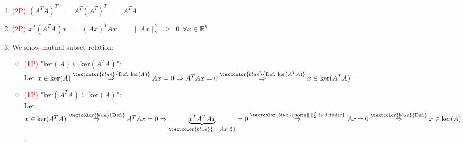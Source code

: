 {
\color{solution}
\begin{enumerate}
	\item   \textcolor{red}{(2P)}
	$(A^TA)^T \ \ =\ \ A^T(A^T)^T\ \ =\ \ A^TA$
	\item  \textcolor{red}{(2P)}
	$x^T(A^TA)x\ \ =\ \ (Ax)^TAx\ \ =\ \ \|{Ax}\|_2^2\ \ \geq\ \ 0\ \ \forall x\in\mathbb{R}^n$
	\item 
	We show mutual subset relation:
	\begin{itemize}
		\item  \textcolor{red}{(1P)}
		\underline{"$\text{ker}(A)\subseteq \text{ker}(A^TA)$":}\\
		Let $x\in \text{ker}(A) \stackrel{\textcolor{blue}{\text{Def.}\ \text{ker}(A)}}{\Rightarrow}Ax=0\Rightarrow A^TAx=0\stackrel{\textcolor{blue}{\text{Def.}\ \text{ker}(A^TA)}}{\Rightarrow}x\in \text{ker}(A^TA)$.
		\item \textcolor{red}{(1P)} \underline{"$\text{ker}(A^TA)\subseteq \text{ker}(A)$":}\\
		Let $x\in \text{ker}(A^TA) \stackrel{\textcolor{blue}{\text{Def.}}}{\Rightarrow}A^TAx=0\Rightarrow \underbrace{x^TA^TAx}_{\textcolor{blue}{=\|{Ax}\|_2^2}}=0 \stackrel{\textcolor{blue}{\text{norm} \|{\cdot}\|_2^2\ \text{is definite}}}{\Rightarrow}Ax=0 \stackrel{\textcolor{blue}{\text{Def.}}}{\Rightarrow}x\in \text{ker}(A)$.
	\end{itemize}
\end{enumerate}
}